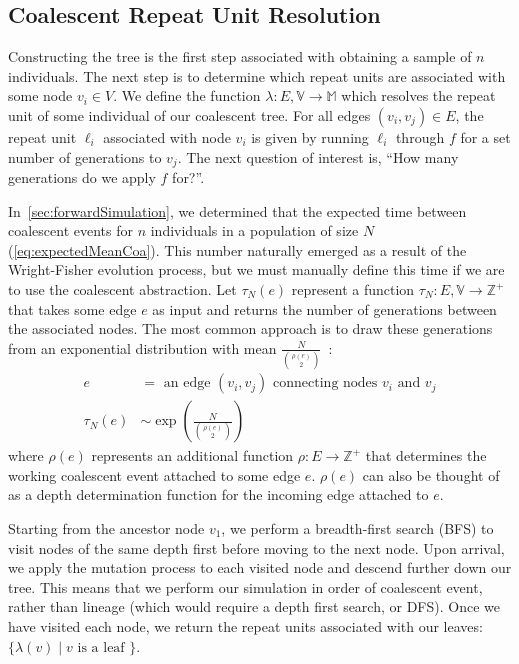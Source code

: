 \subsection{Coalescent Repeat Unit Resolution}\label{subsec:coalescentRepeatLengthResolution}
Constructing the tree is the first step associated with obtaining a sample of $n$ individuals.
The next step is to determine which repeat units are associated with some node $v_i \in V$.
We define the function $\lambda : E,\mathbb{V} \rightarrow \mathbb{M}$ which resolves the repeat unit of some
individual of our coalescent tree.
For all edges $(v_i, v_j) \in E$, the repeat unit $\ell_i$ associated with node $v_i$ is given by running
$\ell_i$ through $f$ for a set number of generations to $v_j$.
The next question of interest is, ``How many generations do we apply $f$ for?''.

In~\autoref{sec:forwardSimulation}, we determined that the expected time between coalescent events for $n$ individuals
in a population of size $N$ (\autoref{eq:expectedMeanCoa}).
This number naturally emerged as a result of the Wright-Fisher evolution process, but we must manually define
this time if we are to use the coalescent abstraction.
Let $\tau_N(e)$ represent a function $\tau_N : E, \mathbb{V} \rightarrow \mathbb{Z}^+$ that takes some edge $e$ as input
and returns the number of generations between the associated nodes.
The most common approach is to draw these generations from an exponential distribution with mean
$\frac{N}{\binom{\rho(e)}{2}}$~\cite{hudsonGeneGenealogiesCoalescent1990}:
\begin{align}
    e &= \text{ an edge } (v_i, v_j) \text{ connecting nodes } v_i \text{ and } v_j \\
    \tau_N(e) &\sim \exp\left(\frac{N}{\binom{\rho(e)}{2}}\right)
\end{align}
where $\rho(e)$ represents an additional function $\rho : E \rightarrow \mathbb{Z}^+$ that determines the working coalescent
event attached to some edge $e$.
$\rho(e)$ can also be thought of as a depth determination function for the incoming edge attached to $e$.

Starting from the ancestor node $v_1$, we perform a breadth-first search (BFS) to visit nodes of the same depth first
before moving to the next node.
Upon arrival, we apply the mutation process to each visited node and descend further down our tree.
This means that we perform our simulation in order of coalescent event, rather than lineage (which would require a
depth first search, or DFS).
Once we have visited each node, we return the repeat units associated with our leaves: $\{ \lambda (v) \mid v
\text{ is a leaf }\}$.

